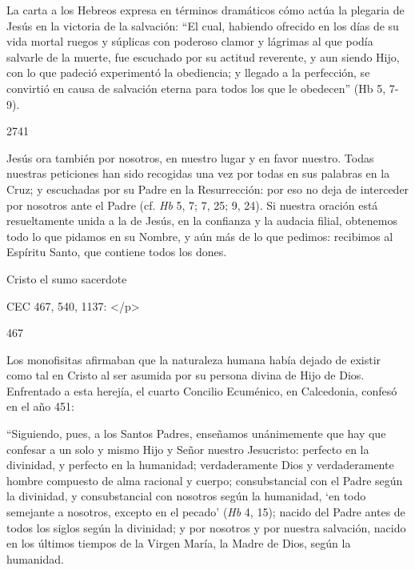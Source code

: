 			\begin{ccebody}La carta a los Hebreos expresa en términos dramáticos cómo actúa la plegaria de Jesús en la victoria de la salvación: “El cual, habiendo ofrecido en los días de su vida mortal ruegos y súplicas con poderoso clamor y lágrimas al que podía salvarle de la muerte, fue escuchado por su actitud reverente, y aun siendo Hijo, con lo que padeció experimentó la obediencia; y llegado a la perfección, se convirtió en causa de salvación eterna para todos los que le obedecen” (Hb 5, 7-9).\end{ccebody}
			
			\begin{ccebody}\begin{ccenumber}2741\end{ccenumber} Jesús ora también por nosotros, en nuestro lugar y en favor nuestro. Todas nuestras peticiones han sido recogidas una vez por todas en sus palabras en la Cruz; y escuchadas por su Padre en la Resurrección: por eso no deja de interceder por nosotros ante el Padre (cf. \textit{Hb} 5, 7; 7, 25; 9, 24). Si nuestra oración está resueltamente unida a la de Jesús, en la confianza y la audacia filial, obtenemos todo lo que pidamos en su Nombre, y aún más de lo que pedimos: recibimos al Espíritu Santo, que contiene todos los dones.\end{ccebody}
			
			\begin{ccetheme}Cristo el sumo sacerdote \end{ccetheme}
			
			\begin{ccereference}\end{ccereference}CEC 467, 540, 1137: </p>
			
			\begin{ccebody}\begin{ccenumber}467\end{ccenumber} Los monofisitas afirmaban que la naturaleza humana había dejado de existir como tal en Cristo al ser asumida por su persona divina de Hijo de Dios. Enfrentado a esta herejía, el cuarto Concilio Ecuménico, en Calcedonia, confesó en el año 451:\end{ccebody}
			
			\begin{ccecite}“Siguiendo, pues, a los Santos Padres, enseñamos unánimemente que hay que confesar a un solo y mismo Hijo y Señor nuestro Jesucristo: perfecto en la divinidad, y perfecto en la humanidad; verdaderamente Dios y verdaderamente hombre compuesto de alma racional y cuerpo; consubstancial con el Padre según la divinidad, y consubstancial con nosotros según la humanidad, ‘en todo semejante a nosotros, excepto en el pecado’ (\textit{Hb} 4, 15); nacido del Padre antes de todos los siglos según la divinidad; y por nosotros y por nuestra salvación, nacido en los últimos tiempos de la Virgen María, la Madre de Dios, según la humanidad.\end{ccecite}
			
